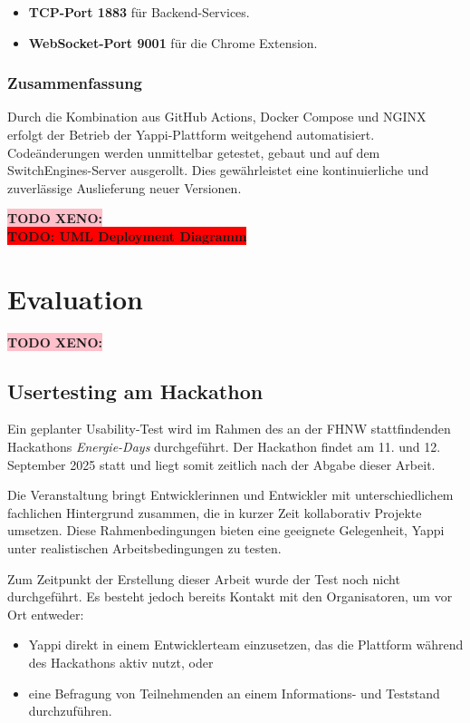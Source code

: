 \documentclass[12pt,a4paper]{report}
\newcommand{\todo}[1]{\colorbox{red}{\textbf{TODO: #1}}\\}
\newcommand{\xeno}[1]{\colorbox{pink}{\textbf{TODO XENO: #1}}\\}
\begin{document}
    \begin{itemize}
        \item \textbf{TCP-Port 1883} für Backend-Services.
        \item \textbf{WebSocket-Port 9001} für  die Chrome Extension.
    \end{itemize}

    \subsection{Zusammenfassung}

    Durch die Kombination aus GitHub Actions, Docker Compose und NGINX erfolgt der Betrieb der Yappi-Plattform weitgehend automatisiert.
    Codeänderungen werden unmittelbar getestet, gebaut und auf dem SwitchEngines-Server ausgerollt. Dies gewährleistet eine kontinuierliche und zuverlässige Auslieferung neuer Versionen.

\xeno{}
\todo{UML Deployment Diagramm}


\chapter{Evaluation}
\xeno{}

 \section{Usertesting am Hackathon}

 Ein geplanter Usability-Test wird im Rahmen des an der FHNW stattfindenden Hackathons \textit{Energie-Days} durchgeführt.
 Der Hackathon findet am 11. und 12. September 2025 statt und liegt somit zeitlich nach der Abgabe dieser Arbeit.

 Die Veranstaltung bringt Entwicklerinnen und Entwickler mit unterschiedlichem fachlichen Hintergrund zusammen, die in
 kurzer Zeit kollaborativ Projekte umsetzen. Diese Rahmenbedingungen bieten eine geeignete Gelegenheit, Yappi unter
 realistischen Arbeitsbedingungen zu testen.

 Zum Zeitpunkt der Erstellung dieser Arbeit wurde der Test noch nicht durchgeführt. Es besteht jedoch bereits Kontakt mit
 den Organisatoren, um vor Ort entweder:
 \begin{itemize}
     \item Yappi direkt in einem Entwicklerteam einzusetzen, das die Plattform während des Hackathons aktiv nutzt, oder
     \item eine Befragung von Teilnehmenden an einem Informations- und Teststand durchzuführen.
 \end{itemize}
\end{document}
